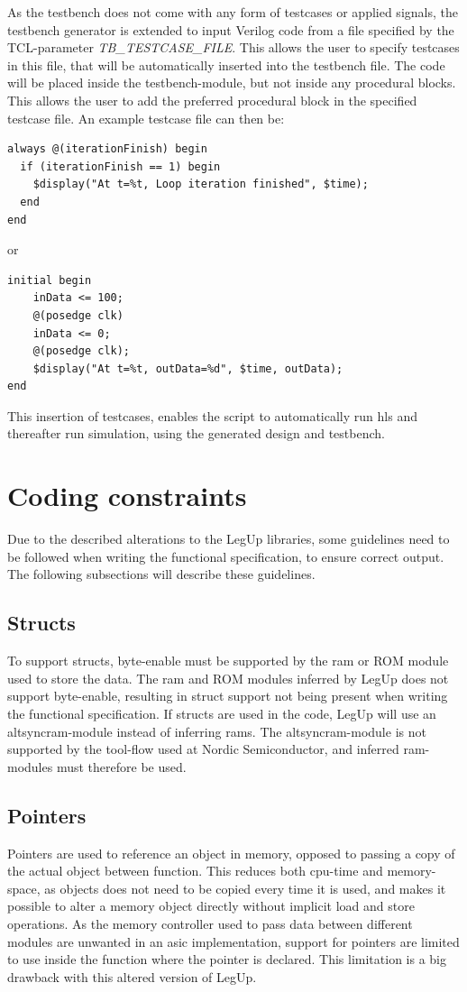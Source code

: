 As the testbench does not come with any form of testcases or applied signals, the testbench generator is extended to input Verilog code from a file specified by the TCL-parameter \textit{TB\_TESTCASE\_FILE}. This allows the user to specify testcases in this file, that will be automatically inserted into the testbench file. The code will be placed inside the testbench-module, but not inside any procedural blocks. This allows the user to add the preferred procedural block in the specified testcase file. An example testcase file can then be:

\lstset{language=Verilog, style=Verilogstyle}
\begin{lstlisting}
always @(iterationFinish) begin
  if (iterationFinish == 1) begin
    $display("At t=%t, Loop iteration finished", $time);
  end
end
\end{lstlisting}
or
\begin{lstlisting}
initial begin
    inData <= 100;
    @(posedge clk)
    inData <= 0;
    @(posedge clk);
    $display("At t=%t, outData=%d", $time, outData);
end
\end{lstlisting}
This insertion of testcases, enables the script to automatically run \gls{hls} and thereafter run simulation, using the generated design and testbench.

\section{Coding constraints}
Due to the described alterations to the LegUp libraries, some guidelines need to be followed when writing the functional specification, to ensure correct output. The following subsections will describe these guidelines.
\subsection{Structs}
To support structs, byte-enable must be supported by the \gls{ram} or ROM module used to store the data. The \gls{ram} and ROM modules inferred by LegUp does not support byte-enable, resulting in struct support not being present when writing the functional specification. If structs are used in the code, LegUp will use an altsyncram-module instead of inferring \gls{ram}s. The altsyncram-module is not supported by the tool-flow used at Nordic Semiconductor, and inferred \gls{ram}-modules must therefore be used. 
\subsection{Pointers}
Pointers are used to reference an object in memory, opposed to passing a copy of the actual object between function. This reduces both \gls{cpu}-time and memory-space, as objects does not need to be copied every time it is used, and makes it possible to alter a memory object directly without implicit load and store operations. As the memory controller used to pass data between different modules are unwanted in an \gls{asic} implementation, support for pointers are limited to use inside the function where the pointer is declared. This limitation is a big drawback with this altered version of LegUp.
